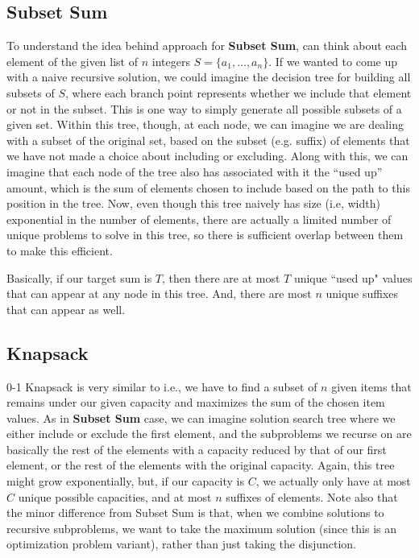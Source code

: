 \documentclass[10pt,a4paper]{article}
\begin{document}
\subsection*{Subset Sum}
\label{sec:subset-sum}

To understand the idea behind approach for \textbf{Subset Sum}, can think about each element of the given list of $n$ integers $S=\{a_1,\dots,a_n\}$. If we wanted to come up with a naive recursive solution, we could imagine the decision tree for building all subsets of $S$, where each branch point represents whether we include that element or not in the subset. This is one way to simply generate all possible subsets of a given set. Within this tree, though, at each node, we can imagine we are dealing with a subset of the original set, based on the subset (e.g. suffix) of elements that we have not made a choice about including or excluding. Along with this, we can imagine that each node of the tree also has associated with it the ``used up'' amount, which is the sum of elements chosen to include based on the path to this position in the tree. Now, even though this tree naively has size (i.e, width) exponential in the number of elements, there are actually a limited number of unique problems to solve in this tree, so there is sufficient overlap between them to make this efficient.

Basically, if our target sum is $T$, then there are at most $T$ unique ``used up" values that can appear at any node in this tree. And, there are most $n$ unique suffixes that can appear as well.


\subsection*{Knapsack}

0-1 Knapsack is very similar to  i.e., we have to find a subset of $n$ given items that remains under our given capacity and maximizes the sum of the chosen item values. As in \textbf{Subset Sum} case, we can imagine solution search tree where we either include or exclude the first element, and the subproblems we recurse on are basically the rest of the elements with a capacity reduced by that of our first element, or the rest of the elements with the original capacity. Again, this tree might grow exponentially, but, if our capacity is $C$, we actually only have at most $C$ unique possible capacities, and at most $n$ suffixes of elements. Note also that the minor difference from Subset Sum is that, when we combine solutions to recursive subproblems, we want to take the maximum solution (since this is an optimization problem variant), rather than just taking the disjunction.
\end{document}
